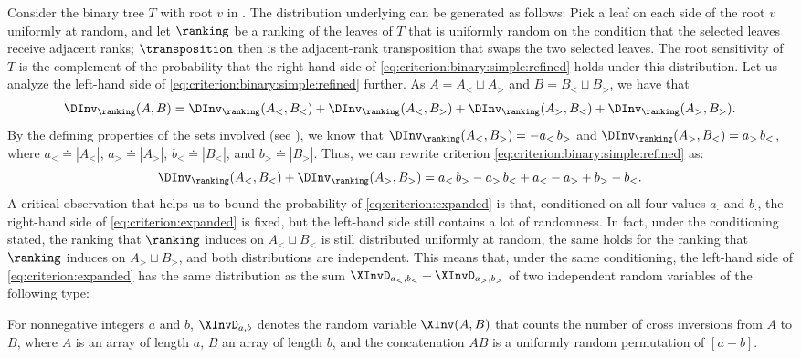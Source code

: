 \documentclass{toc}
\begin{document}
Consider the binary tree $T$ with root $v$ in . The distribution underlying  can be generated as follows: Pick a leaf on each side of the root $v$ uniformly at random, and let $\ranking$ be a ranking of the leaves of $T$ that is uniformly random on the condition that the selected leaves receive adjacent ranks; $\transposition$ then is the adjacent-rank transposition that swaps the two selected leaves. The root sensitivity of $T$ is the complement of the probability that the right-hand side of \eqref{eq:criterion:binary:simple:refined} holds under this distribution. Let us analyze the left-hand side of \eqref{eq:criterion:binary:simple:refined} further. As $A = A_< \sqcup A_>$ and $B = B_< \sqcup B_>$, we have that
\[ \DInv_\ranking(A,B) = \DInv_\ranking(A_<,B_<) + \DInv_\ranking(A_<,B_>) + \DInv_\ranking(A_>,B_<) + \DInv_\ranking(A_>,B_>). \]
By the defining properties of the sets involved (see ), we know that $\DInv_\ranking(A_<,B_>) = - a_< \, b_>$ and $\DInv_\ranking(A_>,B_<) = a_> \, b_<$, where $a_< \doteq |A_<|$, $a_> \doteq |A_>|$, $b_< \doteq |B_<|$, and $b_> \doteq |B_>|$. Thus, we can rewrite criterion \eqref{eq:criterion:binary:simple:refined} as:
\begin{equation}\label{eq:criterion:expanded}
\DInv_\ranking(A_<,B_<) + \DInv_\ranking(A_>,B_>) = a_< \, b_> - a_> \, b_< + a_< - a_> + b_> - b_<.
\end{equation}
A critical observation that helps us to bound the probability of \eqref{eq:criterion:expanded} is that, conditioned on all four values $a_{\cdot}$ and $b_{\cdot}$, the right-hand side of \eqref{eq:criterion:expanded} is fixed, but the left-hand side still contains a lot of randomness. In fact, under the conditioning stated, the ranking that $\ranking$ induces on $A_< \sqcup B_<$ is still distributed uniformly at random, the same holds for the ranking that $\ranking$ induces on $A_> \sqcup B_>$, and both distributions are independent. This means that, under the same conditioning, the left-hand side of \eqref{eq:criterion:expanded} has the same distribution as the sum $\XInvD_{a_<,b_<} + \XInvD_{a_>,b_>}$ of two independent random variables of the following type:
\begin{definition}
For nonnegative integers $a$ and $b$, $\XInvD_{a,b}$ denotes the random variable $\XInv(A,B)$ that counts the number of cross inversions from $A$ to $B$, where $A$ is an array of length $a$, $B$ an array of length $b$, and the concatenation $AB$ is a uniformly random permutation of $[a+b]$.
\end{definition}
\end{document}

